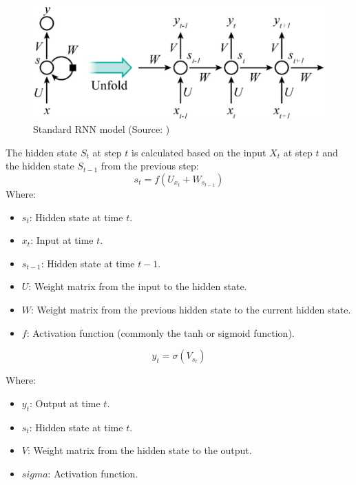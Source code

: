 \documentclass[conference]{IEEEtran}
\begin{document}
\begin{figure}[H]
    \centering
    \begin{minipage}{0.8\linewidth}
    \centering
        \includegraphics[width=\linewidth]{images/RNNModel.png}
    \caption{Standard RNN model (Source: \cite{DeepLearning})}
    \label{fig7}
    \end{minipage}
\end{figure}
The hidden state \( S_t \) at step \( t \) is calculated based on the input \( X_t \) at step \( t \) and the hidden state \( S_{t-1} \) from the previous step:
\[
s_{t} = f(U_{x_{t}} + W_{s_{t-1}})
\]
Where:
\begin{itemize}
    \item \( s_t \): Hidden state at time \( t \).
    \item \( x_{t} \): Input at time \( t \).
    \item \( s_{t-1} \): Hidden state at time \( t-1 \).
    \item \( U \): Weight matrix from the input to the hidden state.
    \item \( W \): Weight matrix from the previous hidden state to the current hidden state.
    \item \( f \): Activation function (commonly the tanh or sigmoid function).
\end{itemize}

\[
y_t = \sigma(V_{s_{t}})
\]

Where:
\begin{itemize}
    \item \( y_t \): Output at time \( t \).
    \item \( s_{t} \): Hidden state at time \( t \).
    \item \( V \): Weight matrix from the hidden state to the output.
    \item \( sigma \): Activation function. 
\end{itemize}
\end{document}
